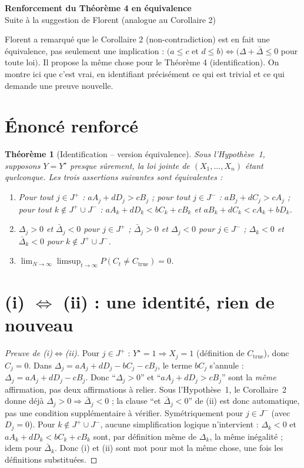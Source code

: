 \documentclass[11pt]{article}
\newtheorem{theorem}{Théorème}
\theoremstyle{remark}
\begin{document}
\begin{center}
{\LARGE\bfseries Renforcement du Théorème 4 en équivalence}\\[4pt]
{\large Suite à la suggestion de Florent (analogue au Corollaire 2)}
\end{center}
\vspace{1em}

Florent a remarqué que le Corollaire 2 (non-contradiction) est en fait une
équivalence, pas seulement une implication : $(a\le c$ et $d\le b) \iff
(\Delta+\bar\Delta\le0$ pour toute loi$)$. Il propose la même chose pour le
Théorème 4 (identification). On montre ici que c'est vrai, en identifiant
précisément ce qui est trivial et ce qui demande une preuve nouvelle.

\section{Énoncé renforcé}

\begin{theorem}[Identification -- version équivalence]\label{thm:identif-equiv}
Sous l'Hypothèse~1, supposons $Y=Y^\star$ presque sûrement, la loi jointe de
$(X_1,\ldots,X_n)$ étant quelconque. Les trois assertions suivantes sont
équivalentes :
\begin{enumerate}
\item[(i)] Pour tout $j\in J^+$ : $aA_j+dD_j>cB_j$ ; pour tout $j\in J^-$ :
$aB_j+dC_j>cA_j$ ; pour tout $k\notin J^+\cup J^-$ : $aA_k+dD_k<bC_k+cB_k$
\emph{et} $aB_k+dC_k<cA_k+bD_k$.
\item[(ii)] $\Delta_j>0$ et $\bar\Delta_j<0$ pour $j\in J^+$ ; $\bar\Delta_j>0$
et $\Delta_j<0$ pour $j\in J^-$ ; $\Delta_k<0$ et $\bar\Delta_k<0$ pour
$k\notin J^+\cup J^-$.
\item[(iii)] $\displaystyle\lim_{N\to\infty}\limsup_{t\to\infty}P(C_t\ne C_{\mathrm{true}})=0$.
\end{enumerate}
\end{theorem}

\section{(i) $\iff$ (ii) : une identité, rien de nouveau}

\begin{proof}[Preuve de (i)$\iff$(ii)]
Pour $j\in J^+$ : $Y^\star=1\Rightarrow X_j=1$ (définition de $C_{\mathrm{true}}$),
donc $C_j=0$. Dans $\Delta_j=aA_j+dD_j-bC_j-cB_j$, le terme $bC_j$ s'annule :
$\Delta_j=aA_j+dD_j-cB_j$. Donc ``$\Delta_j>0$'' et ``$aA_j+dD_j>cB_j$'' sont
la \emph{même} affirmation, pas deux affirmations à relier. Sous
l'Hypothèse~1, le Corollaire~2 donne déjà $\Delta_j>0\Rightarrow\bar\Delta_j<0$ ;
la clause ``et $\bar\Delta_j<0$'' de (ii) est donc automatique, pas une
condition supplémentaire à vérifier. Symétriquement pour $j\in J^-$ (avec
$D_j=0$). Pour $k\notin J^+\cup J^-$, aucune simplification logique
n'intervient : $\Delta_k<0$ et $aA_k+dD_k<bC_k+cB_k$ sont, par définition
même de $\Delta_k$, la même inégalité ; idem pour $\bar\Delta_k$. Donc (i) et
(ii) sont mot pour mot la même chose, une fois les définitions substituées.
\end{proof}
\end{document}
